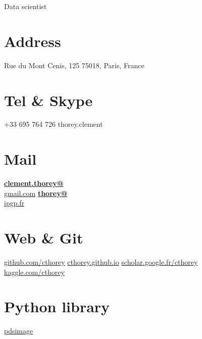 \documentclass[]{friggeri-cv}
\begin{document}
      {Data scientist}
      

\begin{aside}
  \section{Address}
    Rue du Mont Cenis, 125
    75018, Paris, France
    ~
  \section{Tel \& Skype}
    +33 695 764 726
    thorey.clement
    ~
  \section{Mail}
    \href{mailto:clement.thorey@gmail.com}{\textbf{clement.thorey@}\\gmail.com}
    \href{mailto:thorey@ipgp.fr}{\textbf{thorey@}\\ipgp.fr}
    ~
  \section{Web \& Git}
    \href{https://github.com/cthorey}{github.com/cthorey}
    \href{http://cthorey.github.io./}{cthorey.github.io}
    \href{https://scholar.google.fr/citations?user=p5M6SxAAAAAJ&hl=fr&oi=ao}{scholar.google.fr/cthorey}
    \href{https://www.kaggle.com/cthorey/}{kaggle.com/cthorey}
    ~
  \section{Python library}
    \href{http://pdsimage.readthedocs.org/en/latest/}{pdsimage}
  ~  

\end{aside}
\end{document}
